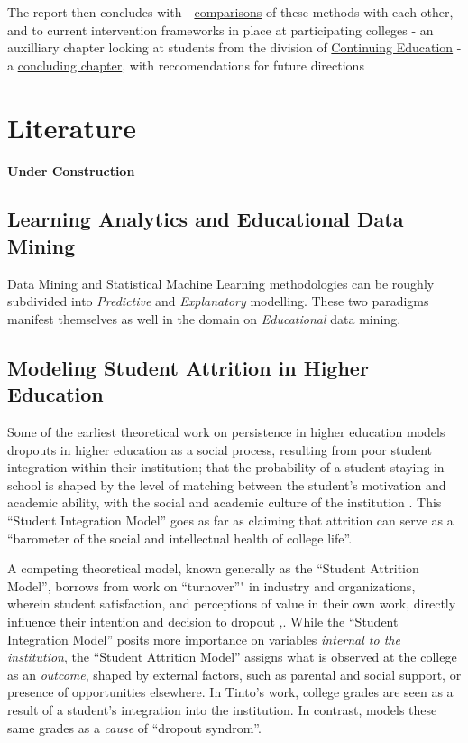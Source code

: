 \documentclass[]{book}
\theoremstyle{definition}
\theoremstyle{definition}
\theoremstyle{remark}
\begin{document}
The report then concludes with -
\protect\hyperlink{comparisons}{comparisons} of these methods with each
other, and to current intervention frameworks in place at participating
colleges - an auxilliary chapter looking at students from the division
of \protect\hyperlink{conted}{Continuing Education} - a
\protect\hyperlink{conclusion}{concluding chapter}, with reccomendations
for future directions

\hypertarget{littreview}{\chapter{Literature}\label{littreview}}

\textbf{Under Construction }

\section{Learning Analytics and Educational Data
Mining}\label{learning-analytics-and-educational-data-mining}

Data Mining and Statistical Machine Learning methodologies can be
roughly subdivided into \emph{Predictive} and \emph{Explanatory}
modelling\citep{shmueli2010explain}. These two paradigms manifest
themselves as well in the domain on \emph{Educational} data
mining\citep{hla2017Liu}.

\section{Modeling Student Attrition in Higher
Education}\label{modeling-student-attrition-in-higher-education}

Some of the earliest theoretical work on persistence in higher education
\citep{tinto1975dropout} models dropouts in higher education as a social
process, resulting from poor student integration within their
institution; that the probability of a student staying in school is
shaped by the level of matching between the student's motivation and
academic ability, with the social and academic culture of the
institution \citep{cabrera1993StructuralEquations}. This ``Student
Integration Model'' goes as far as claiming that attrition can serve as
a ``barometer of the social and intellectual health of college
life''\citep{tinto1987Attrition}.

A competing theoretical model, known generally as the ``Student
Attrition Model'', borrows from work on ``turnover''" in industry and
organizations, wherein student satisfaction, and perceptions of value in
their own work, directly influence their intention and decision to
dropout \citep{bean1980dropouts},\citep{bean1983turnover}. While the
``Student Integration Model'' posits more importance on variables
\emph{internal to the institution}, the ``Student Attrition Model''
assigns what is observed at the college as an \emph{outcome}, shaped by
external factors, such as parental and social support, or presence of
opportunities elsewhere. In Tinto's work, college grades are seen as a
result of a student's integration into the institution. In contrast,
\citep{bean1985interaction} models these same grades as a \emph{cause}
of ``dropout syndrom''.
\end{document}
